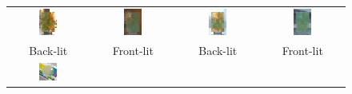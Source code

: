 \begin{figure}[t]
	\centering
	\addtolength{\tabcolsep}{-3.5pt}
	\begin{tabular}{cccc}
		\includegraphics[width=0.24\textwidth]{images/results/zhaoyun_bg1_1.jpg} &
		\includegraphics[width=0.24\textwidth]{images/results/zhaoyun_bg1_2.jpg} &
		\includegraphics[width=0.24\textwidth]{images/results/zhaoyun_bg2_1.jpg} &
		\includegraphics[width=0.24\textwidth]{images/results/zhaoyun_bg2_2.jpg}\\
		Back-lit & Front-lit & Back-lit & Front-lit
		\\[5pt]
		\includegraphics[width=0.24\textwidth]{images/results/magnify_g9.jpg} &

\end{tabular}
\end{figure}
